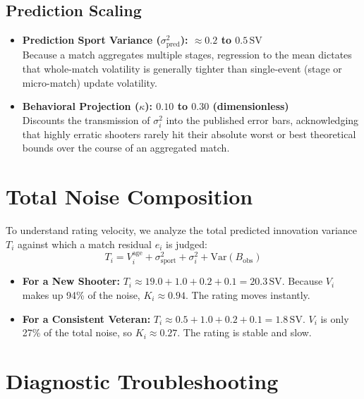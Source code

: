 \documentclass[12pt]{article}
\begin{document}
	\subsection{Prediction Scaling}
	\begin{itemize}
		\item \textbf{Prediction Sport Variance ($\sigma_{\mathrm{pred}}^2$): $\approx 0.2$ to $0.5\,\text{SV}$}\\
		Because a match aggregates multiple stages, regression to the mean dictates that whole-match volatility is generally tighter than single-event (stage or micro-match) update volatility.
		\item \textbf{Behavioral Projection ($\kappa$): $0.10$ to $0.30$ (dimensionless)}\\
		Discounts the transmission of $\sigma_i^2$ into the published error bars, acknowledging that highly erratic shooters rarely hit their absolute worst or best theoretical bounds over the course of an aggregated match.
	\end{itemize}
	
	\section{Total Noise Composition}
	To understand rating velocity, we analyze the total predicted innovation variance $T_i$ against which a match residual $e_i$ is judged:
	\begin{equation}
		T_i = V_i^{\mathrm{age}} + \sigma_{\mathrm{sport}}^2 + \sigma_i^2 + \mathrm{Var}(B_{\mathrm{obs}})
	\end{equation}
	\begin{itemize}
		\item \textbf{For a New Shooter:} $T_i \approx 19.0 + 1.0 + 0.2 + 0.1 = 20.3\,\text{SV}$. Because $V_i$ makes up 94\% of the noise, $K_i \approx 0.94$. The rating moves instantly.
		\item \textbf{For a Consistent Veteran:} $T_i \approx 0.5 + 1.0 + 0.2 + 0.1 = 1.8\,\text{SV}$. $V_i$ is only 27\% of the total noise, so $K_i \approx 0.27$. The rating is stable and slow.
	\end{itemize}
	
	\section{Diagnostic Troubleshooting}
	
\end{document}
